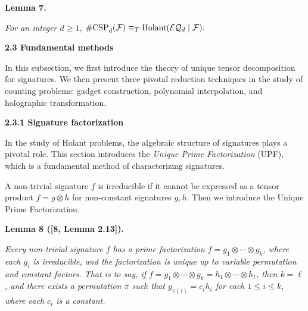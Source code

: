 \documentclass[10pt,a4paper]{article}
\begin{document}
\par\medskip\noindent\textbf{
\textbf{Lemma 7}\textbf{.}
}\par



\emph{For an integer $d\geq 1$, $\textup{{\#CSP}}_{d}(\mathcal{F})\equiv_{T}\textup{{Holant}}(\mathcal{EQ}_{d}\mid\mathcal{F}).$}\par







\par\medskip\noindent\textbf{
2.3 Fundamental methods}\par




In this subsection, we first introduce the theory of unique tensor decomposition for signatures. We then present three pivotal reduction techniques in the study of counting problems: gadget construction, polynomial interpolation, and holographic transformation.\par




\par\medskip\noindent\textbf{
2.3.1 Signature factorization}\par




In the study of Holant problems, the algebraic structure of signatures plays a pivotal role. This section introduces the \emph{Unique Prime Factorization} (UPF), which is a fundamental method of characterizing signatures.\par




A non-trivial signature $f$ is irreducible if it cannot be expressed as a tensor product $f=g\otimes h$ for non-constant signatures $g,h$. Then we introduce the Unique Prime Factorization.\par





\par\medskip\noindent\textbf{
\textbf{Lemma 8}\textbf{ }([8, Lemma 2.13])\textbf{.}
}\par



\emph{Every non-trivial signature $f$ has a prime factorization $f=g_{1}\otimes\cdots\otimes g_{k}$, where each $g_{i}$ is irreducible, and the factorization is unique up to variable permutation and constant factors. That is to say, if $f=g_{1}\otimes\cdots\otimes g_{k}=h_{1}\otimes\cdots\otimes h_{\ell}$, then $k=\ell$, and there exists a permutation $\pi$ such that $g_{\pi(i)}=c_{i}h_{i}$ for each $1\leq i\leq k$, where each $c_{i}$ is a constant.}\par
\end{document}
